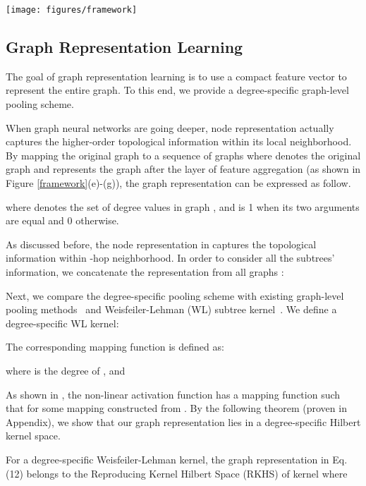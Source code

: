 \documentclass[sigconf]{acmart}
\newcommand{\demonet}{{\emph {DEMO-Net}}}
\begin{document}
\begin{figure*}
\centering
\texttt{[image: figures/framework]}
\caption{Overview of our proposed \demonet\ framework (best seen in color). (b) and (c) represent the multi-task feature aggregation. The node representation in (d) can be used for node-level classification. For learning graph embedding, (e)-(g) provide the graph-level pooling method based on node degree distribution for learning graph representation.}
\label{framework}
\vspace{-3mm}
\end{figure*}

\subsection{Graph Representation Learning}
The goal of graph representation learning is to use a compact feature vector to represent the entire graph. To this end, we provide a degree-specific graph-level pooling scheme.

When graph neural networks are going deeper, node representation actually captures the higher-order topological information within its local neighborhood. By mapping the original graph to a sequence of graphs  where  denotes the original graph and  represents the graph after the  layer of feature aggregation (as shown in Figure \ref{framework}(e)-(g)), the  graph representation can be expressed as follow.

where  denotes the set of degree values in graph , and  is 1 when its two arguments are equal and 0 otherwise.

As discussed before, the node representation in  captures the topological information within -hop neighborhood. In order to consider all the subtrees' information, we concatenate the representation  from all graphs :




Next, we compare the degree-specific pooling scheme with existing graph-level pooling methods~\cite{atwood2016diffusion, xu2018powerful} and Weisfeiler-Lehman (WL) subtree kernel~\cite{shervashidze2011weisfeiler}.
We define a degree-specific WL kernel:

The corresponding mapping function is defined as:

where  is the degree of , and


As shown in \cite{lei2017deriving}, the non-linear activation function  has a mapping function  such that  for some mapping  constructed from .
By the following theorem (proven in Appendix), we show that our graph representation lies in a degree-specific Hilbert kernel space. 
\begin{theorem}
\label{T: kernel}
For a degree-specific Weisfeiler-Lehman kernel, the graph representation  in Eq. (12) belongs to the Reproducing Kernel Hilbert Space (RKHS) of kernel  where

\end{theorem}
\end{document}
